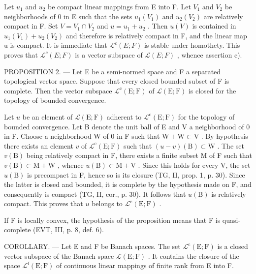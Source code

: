 Let \(u_{1}\) and \(u_{2}\) be compact linear mappings from E into F. Let \(V_{1}\) and \(V_{2}\) be neighborhoods of 0 in E such that the sets \(u_{1}(V_{1})\) and \(u_{2}(V_{2})\) are relatively compact in F. Set \(V = V_{1} \cap V_{2}\) and \(u = u_{1} + u_{2}\) . Then \(u(V)\) is contained in \(u_{1}(V_{1}) + u_{2}(V_{2})\) and therefore is relatively compact in F, and the linear map u is compact. It is immediate that \(\mathcal{L}^{c}(E;F)\) is stable under homothety. This proves that \(\mathcal{L}^{c}(E;F)\) is a vector subspace of \(\mathcal{L}(E;F)\) , whence assertion c).

PROPOSITION 2. --- Let E be a semi-normed space and F a separated topological vector space. Suppose that every closed bounded subset of F is complete. Then the vector subspace \(\mathcal{L}^{\mathrm{c}}(\mathrm{E};\mathrm{F})\) of \(\mathcal{L}(\mathrm{E};\mathrm{F})\) is closed for the topology of bounded convergence.

Let \(u\) be an element of \(\mathcal{L}(\mathrm{E};\mathrm{F})\) adherent to \(\mathcal{L}^{\mathrm{c}}(\mathrm{E};\mathrm{F})\) for the topology of bounded convergence. Let B denote the unit ball of E and V a neighborhood of 0 in F. Choose a neighborhood W of 0 in F such that \(\mathrm{W} + \mathrm{W} \subset \mathrm{V}\) . By hypothesis there exists an element \(v\) of \(\mathcal{L}^{\mathrm{c}}(\mathrm{E};\mathrm{F})\) such that \((u - v)(\mathrm{B}) \subset \mathrm{W}\) . The set \(v(\mathrm{B})\) being relatively compact in F, there exists a finite subset M of F such that \(v(\mathrm{B}) \subset \mathrm{M} + \mathrm{W}\) , whence \(u(\mathrm{B}) \subset \mathrm{M} + \mathrm{V}\) . Since this holds for every V, the set \(u(\mathrm{B})\) is precompact in F, hence so is its closure (TG, II, prop. 1, p. 30). Since the latter is closed and bounded, it is complete by the hypothesis made on F, and consequently is compact (TG, II, cor., p. 30). It follows that \(u(\mathrm{B})\) is relatively compact. This proves that \(u\) belongs to \(\mathcal{L}^{\mathrm{c}}(\mathrm{E};\mathrm{F})\) .

If F is locally convex, the hypothesis of the proposition means that F is quasi-complete (EVT, III, p. 8, def. 6).

COROLLARY. --- Let E and F be Banach spaces. The set \(\mathcal{L}^{\mathrm{c}}(\mathrm{E};\mathrm{F})\) is a closed vector subspace of the Banach space \(\mathcal{L}(\mathrm{E};\mathrm{F})\) . It contains the closure of the space \(\mathcal{L}^{\mathrm{f}}(\mathrm{E};\mathrm{F})\) of continuous linear mappings of finite rank from E into F.

